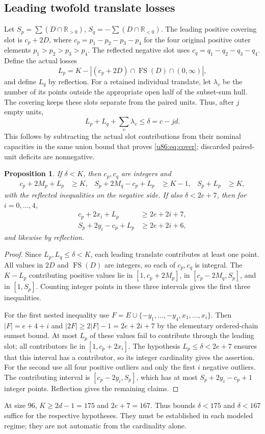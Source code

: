 \documentclass[11pt,a4paper]{article}
\newtheorem{proposition}[theorem]{Proposition}
\theoremstyle{remark}
\newcommand{\FS}{\operatorname{FS}}
\newcommand{\R}{\mathbb R}
\begin{document}
\subsection{Leading twofold translate losses}
Let $S_p=\sum(D\cap\R_{>0})$, $S_q=-\sum(D\cap\R_{<0})$.
The leading positive covering slot is $c_p+2D$, where
$c_p=p_1-p_2-p_3-p_4$ for the four original positive outer elements
$p_1>p_2>p_3>p_4$. The reflected negative slot uses
$c_q=q_1-q_2-q_3-q_4$. Define the actual losses
\[
 L_p=K-|(c_p+2D)\cap\FS(D)\cap(0,\infty)|,
\]
and define $L_q$ by reflection. For a retained individual translate,
let $\lambda_v$ be the number of its points outside the appropriate
open half of the subset-sum hull. The covering keeps these
slots separate from the paired units. Thus, after $j$ empty units,
\begin{equation}\label{u86:eq:loss}
 L_p+L_q+\sum_v\lambda_v\le\delta=c-jd.
\end{equation}
This follows by subtracting the actual slot contributions from their
nominal capacities in the same union bound that proves
\eqref{u86:eq:cover}; discarded paired-unit deficits are nonnegative.

\begin{proposition}\label{u86:prop:leading}
If $\delta<K$, then $c_p,c_q$ are integers and
\begin{align*}
 c_p+2M_p+L_p&\ge K,&
 S_p+2M_q-c_p+L_p&\ge K-1,& S_p+L_p&\ge K,
\end{align*}
with the reflected inequalities on the negative side. If also
$\delta<2e+7$, then for $i=0,\ldots,4$,
\begin{align*}
 c_p+2x_i+L_p&\ge2e+2i+7,\\
 S_p+2y_i-c_p+L_p&\ge2e+2i+6,
\end{align*}
and likewise by reflection.
\end{proposition}
\begin{proof}
Since $L_p,L_q\le\delta<K$, each leading translate contributes at
least one point. All values in $2D$ and $\FS(D)$ are integers, so each
of $c_p,c_q$ is integral. The $K-L_p$ contributing positive values lie
in $[1,c_p+2M_p]$, in $[c_p-2M_q,S_p]$, and in $[1,S_p]$.
Counting integer points in these three intervals gives the first
three inequalities.

For the first nested inequality use
$F=E\cup\{-y_1,\ldots,-y_4,x_1,\ldots,x_i\}$. Then
$|F|=e+4+i$ and $|2F|\ge2|F|-1=2e+2i+7$ by the elementary ordered-chain
sumset bound. At most $L_p$ of these values fail to contribute through
the leading slot; all contributors lie in $[1,c_p+2x_i]$.
The hypothesis $L_p\le\delta<2e+7$ ensures that this interval has a
contributor, so its integer cardinality gives the assertion. For the
second use all four positive outliers and only the first $i$ negative
outliers. The contributing interval is $[c_p-2y_i,S_p]$, which has at
most $S_p+2y_i-c_p+1$ integer points. Reflection gives the remaining
claims.
\end{proof}
At size 96, $K\ge2d-1=175$ and $2e+7=167$. Thus bounds
$\delta<175$ and $\delta<167$ suffice for the respective hypotheses.
They must be established in each modeled regime; they are not automatic
from the cardinality alone.
\end{document}
